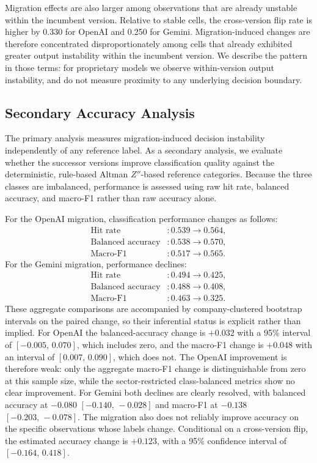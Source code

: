 \documentclass{ieeeaccess}
\begin{document}
Migration effects are also larger among observations that are already unstable within the incumbent version. Relative to stable cells, the cross-version flip rate is higher by 0.330 for OpenAI and 0.250 for Gemini. Migration-induced changes are therefore concentrated disproportionately among cells that already exhibited greater output instability within the incumbent version. We describe the pattern in those terms: for proprietary models we observe within-version output instability, and do not measure proximity to any underlying decision boundary.

\subsection{Secondary Accuracy Analysis}
\label{sec:acc}
The primary analysis measures migration-induced decision instability independently of any reference label. As a secondary analysis, we evaluate whether the successor versions improve classification quality against the deterministic, rule-based Altman $Z''$-based reference categories. Because the three classes are imbalanced, performance is assessed using raw hit rate, balanced accuracy, and macro-F1 rather than raw accuracy alone.

For the OpenAI migration, classification performance changes as follows:
\begin{equation}
\begin{aligned}
\text{Hit rate} &: 0.539 \rightarrow 0.564,\\
\text{Balanced accuracy} &: 0.538 \rightarrow 0.570,\\
\text{Macro-F1} &: 0.517 \rightarrow 0.565.
\end{aligned}
\end{equation}
For the Gemini migration, performance declines:
\begin{equation}
\begin{aligned}
\text{Hit rate} &: 0.494 \rightarrow 0.425,\\
\text{Balanced accuracy} &: 0.488 \rightarrow 0.408,\\
\text{Macro-F1} &: 0.463 \rightarrow 0.325.
\end{aligned}
\end{equation}
These aggregate comparisons are accompanied by company-clustered bootstrap intervals on the paired change, so their inferential status is explicit rather than implied. For OpenAI the balanced-accuracy change is $+0.032$ with a 95\% interval of $[-0.005,\,0.070]$, which includes zero, and the macro-F1 change is $+0.048$ with an interval of $[0.007,\,0.090]$, which does not. The OpenAI improvement is therefore weak: only the aggregate macro-F1 change is distinguishable from zero at this sample size, while the sector-restricted class-balanced metrics show no clear improvement. For Gemini both declines are clearly resolved, with balanced accuracy at $-0.080$ $[-0.140,\,-0.028]$ and macro-F1 at $-0.138$ $[-0.203,\,-0.078]$. The migration also does not reliably improve accuracy on the specific observations whose labels change. Conditional on a cross-version flip, the estimated accuracy change is $+0.123$, with a 95\% confidence interval of $[-0.164,\,0.418]$.
\end{document}
